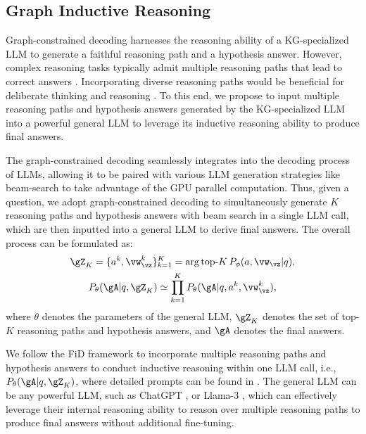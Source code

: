 

\subsection{Graph Inductive Reasoning}
Graph-constrained decoding harnesses the reasoning ability of a KG-specialized LLM to generate a faithful reasoning path and a hypothesis answer. However, complex reasoning tasks typically admit multiple reasoning paths that lead to correct answers \citep{stanovich2000individual}. Incorporating diverse reasoning paths would be beneficial for deliberate thinking and reasoning \citep{evans2010intuition,wangself}. To this end, we propose to input multiple reasoning paths and hypothesis answers generated by the KG-specialized LLM into a powerful general LLM to leverage its inductive reasoning ability to produce final answers.

The graph-constrained decoding seamlessly integrates into the decoding process of LLMs, allowing it to be paired with various LLM generation strategies like beam-search \citep{federico1995language} to take advantage of the GPU parallel computation. Thus, given a question, we adopt graph-constrained decoding to simultaneously generate $K$ reasoning paths and hypothesis answers with beam search in a single LLM call, which are then inputted into a general LLM to derive final answers. The overall process can be formulated as:
%
{
\begin{gather}
    \gZ_K=\{a^k, \vw^k_{\vz}\}_{k=1}^K = \mathop{\mathrm{arg\,top}\text{-}K} P_\phi(a, \vw_\vz|q),\\
    P_\theta(\gA|q, \gZ_K) \simeq \prod_{k=1}^{K} P_\theta(\gA|q, a^k, \vw^k_{\vz}),
\end{gather}
where $\theta$ denotes the parameters of the general LLM, $\gZ_K$ denotes the set of top-$K$ reasoning paths and hypothesis answers, and $\gA$ denotes the final answers.
}

We follow the FiD framework \citep{izacard2021leveraging,singh2021end} to incorporate multiple reasoning paths and hypothesis answers to conduct inductive reasoning within one LLM call, i.e., $P_\theta(\gA|q, \gZ_K)$, where detailed prompts can be found in . The general LLM can be any powerful LLM, such as ChatGPT \citep{chatgpt}, or Llama-3 \citep{llama3}, which can effectively leverage their internal reasoning ability to reason over multiple reasoning paths to produce final answers without additional fine-tuning.